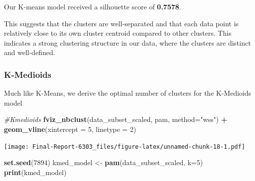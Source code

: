 \documentclass[
]{article}
\newenvironment{Shaded}{\begin{snugshade}}{\end{snugshade}}
\newcommand{\AttributeTok}[1]{\textcolor[rgb]{0.13,0.29,0.53}{#1}}
\newcommand{\CommentTok}[1]{\textcolor[rgb]{0.56,0.35,0.01}{\textit{#1}}}
\newcommand{\DecValTok}[1]{\textcolor[rgb]{0.00,0.00,0.81}{#1}}
\newcommand{\FunctionTok}[1]{\textcolor[rgb]{0.13,0.29,0.53}{\textbf{#1}}}
\newcommand{\NormalTok}[1]{#1}
\newcommand{\OtherTok}[1]{\textcolor[rgb]{0.56,0.35,0.01}{#1}}
\newcommand{\SpecialCharTok}[1]{\textcolor[rgb]{0.81,0.36,0.00}{\textbf{#1}}}
\newcommand{\StringTok}[1]{\textcolor[rgb]{0.31,0.60,0.02}{#1}}
\begin{document}
Our K-means model received a silhouette score of \textbf{0.7578}.

This suggests that the clusters are well-separated and that each data
point is relatively close to its own cluster centroid compared to other
clusters. This indicates a strong clustering structure in our data,
where the clusters are distinct and well-defined.

\subsubsection{K-Medioids}\label{k-medioids}

Much like K-Means, we derive the optimal number of clusters for the
K-Medioids model

\begin{Shaded}
\begin{Highlighting}[]
\CommentTok{\#Kmedioids}
\FunctionTok{fviz\_nbclust}\NormalTok{(data\_subset\_scaled, pam, }\AttributeTok{method=}\StringTok{"wss"}\NormalTok{) }\SpecialCharTok{+}
  \FunctionTok{geom\_vline}\NormalTok{(}\AttributeTok{xintercept =} \DecValTok{5}\NormalTok{, }\AttributeTok{linetype =} \DecValTok{2}\NormalTok{)}
\end{Highlighting}
\end{Shaded}

\texttt{[image: Final-Report-6303\_files/figure-latex/unnamed-chunk-18-1.pdf]}

\begin{Shaded}
\begin{Highlighting}[]
\FunctionTok{set.seed}\NormalTok{(}\DecValTok{7894}\NormalTok{)}
\NormalTok{kmed\_model }\OtherTok{\textless{}{-}} \FunctionTok{pam}\NormalTok{(data\_subset\_scaled, }\AttributeTok{k=}\DecValTok{5}\NormalTok{)}
\FunctionTok{print}\NormalTok{(kmed\_model)}
\end{Highlighting}
\end{Shaded}
\end{document}
